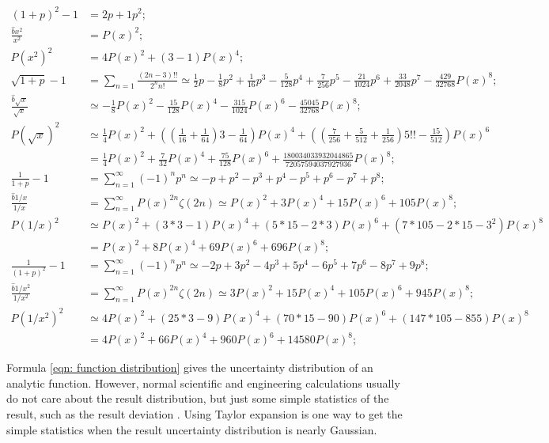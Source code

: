 \documentclass[twoside]{article}
\numberwithin{equation}{section}
\begin{document}
\begin{align*}
(1 + p)^2 - 1 &= 2p + 1p^2; \\
\frac{\hat{b} x^2}{x^2} &= P(x)^2; \\
P(x^2)^2 &= 4 P(x)^2 + (3 - 1) P(x)^4; \\
\sqrt{1 + p} - 1 & = \sum_{n=1} \frac{(2n-3)!!}{2^n n!}
 \simeq \frac{1}{2} p - \frac{1}{8} p^2 + \frac{1}{16} p^3 - \frac{5}{128} p^4 + \frac{7}{256} p^5 - \frac{21}{1024} p^6 + \frac{33}{2048} p^7 - \frac{429}{32768} P(x)^8; \\
\frac{\hat{b} \sqrt{x}}{\sqrt{x}} &\simeq - \frac{1}{8} P(x)^2 - \frac{15}{128} P(x)^4 - \frac{315}{1024} P(x)^6 - \frac{45045}{32768} P(x)^8; \\
P(\sqrt{x})^2 &\simeq \frac{1}{4} P(x)^2
  + ((\frac{1}{16} + \frac{1}{64}) 3 - \frac{1}{64}) P(x)^4
  + ((\frac{7}{256} + \frac{5}{512} + \frac{1}{256}) 5!! - \frac{15}{512}) P(x)^6 \\
 &= \frac{1}{4} P(x)^2 + \frac{7}{32} P(x)^4 + \frac{75}{128} P(x)^6 + \frac{180034033932044865}{72057594037927936} P(x)^8; \\
\frac{1}{1 + p} - 1 & = \sum_{n=1}^{\infty} (-1)^n p^n \simeq -p + p^2 - p^3 + p^4 - p^5 + p^6 - p^7 + p^8; \\
\frac{\hat{b} 1/x}{1/x} & = \sum_{n=1}^{\infty} P(x)^{2n} \zeta(2n) \simeq P(x)^2 + 3 P(x)^4 + 15 P(x)^6 + 105 P(x)^8; \\
P(1/x)^2 &\simeq P(x)^2 + (3 * 3 - 1) P(x)^4 + (5 * 15 - 2 * 3) P(x)^6 + (7 * 105 - 2 * 15 - 3^2) P(x)^8 \\
 &= P(x)^2 + 8 P(x)^4 + 69 P(x)^6 + 696 P(x)^8; \\
\frac{1}{(1 + p)^2} - 1 & = \sum_{n=1}^{\infty} (-1)^n p^n \simeq -2 p + 3 p^2 - 4 p^3 + 5 p^4 - 6 p^5 + 7 p^6 - 8 p^7 + 9 p^8; \\
\frac{\hat{b} 1/x^2}{1/x^2} & = \sum_{n=1}^{\infty} P(x)^{2n} \zeta(2n) \simeq 3 P(x)^2 + 15 P(x)^4 + 105 P(x)^6 + 945 P(x)^8; \\
P(1/x^2)^2 &\simeq 4 P(x)^2 + (25 * 3 - 9) P(x)^4 + (70 * 15 - 90) P(x)^6 + (147 * 105 - 855) P(x)^8 \\
 &= 4 P(x)^2 + 66 P(x)^4 + 960 P(x)^6 + 14580 P(x)^8;
\end{align*}

\fi




Formula \eqref{eqn: function distribution} gives the uncertainty distribution of an analytic function.
However, normal scientific and engineering calculations usually do not care about the result distribution, but just some simple statistics of the result, such as the result deviation \cite{Statistical_Methods} \cite{Precisions_Physical_Measurements}.
Using Taylor expansion is one way to get the simple statistics when the result uncertainty distribution is nearly Gaussian.
\end{document}
